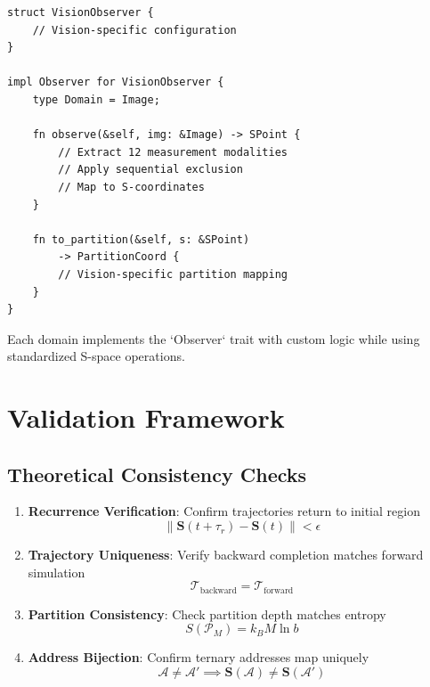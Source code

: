 \documentclass[twocolumn,10pt]{article}
\begin{document}
\begin{verbatim}
struct VisionObserver {
    // Vision-specific configuration
}

impl Observer for VisionObserver {
    type Domain = Image;

    fn observe(&self, img: &Image) -> SPoint {
        // Extract 12 measurement modalities
        // Apply sequential exclusion
        // Map to S-coordinates
    }

    fn to_partition(&self, s: &SPoint)
        -> PartitionCoord {
        // Vision-specific partition mapping
    }
}
\end{verbatim}

Each domain implements the `Observer` trait with custom logic while using standardized S-space operations.

\section{Validation Framework}

\subsection{Theoretical Consistency Checks}

\begin{enumerate}
\item \textbf{Recurrence Verification}: Confirm trajectories return to initial region
\begin{equation}
\|\mathbf{S}(t + \tau_r) - \mathbf{S}(t)\| < \epsilon
\end{equation}

\item \textbf{Trajectory Uniqueness}: Verify backward completion matches forward simulation
\begin{equation}
\mathcal{T}_{\text{backward}} = \mathcal{T}_{\text{forward}}
\end{equation}

\item \textbf{Partition Consistency}: Check partition depth matches entropy
\begin{equation}
S(\mathcal{P}_M) = k_B M \ln b
\end{equation}

\item \textbf{Address Bijection}: Confirm ternary addresses map uniquely
\begin{equation}
\mathcal{A} \neq \mathcal{A}' \implies \mathbf{S}(\mathcal{A}) \neq \mathbf{S}(\mathcal{A}')
\end{equation}
\end{enumerate}
\end{document}
